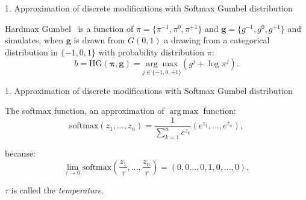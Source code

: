 \documentclass[10pt,aspectratio=169]{beamer}
\renewcommand{\vec}[1]{\mathbf{#1}}
\DeclareMathOperator*{\argmax}{arg\,max}
\begin{document}

\begin{frame}{1. Approximation of discrete modifications with Softmax Gumbel distribution}

    \begin{tcolorbox}[colback=lightgreen,colframe=greentheme,title=\textbf{Definition} (Hardmax Gumbel Function)]
        Hardmax Gumbel~ is a function of  $\pi = \{\pi^{-1},\pi^{0}, \pi^{+1}\}$ and $\vec{g} = \{g^{-1},g^{0}, g^{+1}\}$ and simulates, when $\vec{g}$ is drawn from $G(0,1)$ a drawing from a categorical distribution in $\{-1,0,1\}$ with probability distribution $\pi$:  
        \begin{equation}
            b = \mbox{HG}(\bm{\pi}, \vec{g}) = \underset{{j \in \{-1,0,+1\}}}{\arg \max} (g^j+ \log \pi^j).
        \end{equation}
    \end{tcolorbox}

\end{frame}

\begin{frame}{1. Approximation of discrete modifications with Softmax Gumbel distribution}
    
    The softmax function, an approximation of $\argmax$ function:
    \begin{equation}
        \mbox{softmax}\left(z_1,\ldots,z_n\right) = \frac{1}{\sum_{k=1}^n e^{z_k}}(e^{z_1},\ldots,e^{z_n}),
    \end{equation}

    because: 
    \begin{equation}
        \lim_{\tau \rightarrow 0} \mbox{softmax}\left(\frac{z_1}{\tau},\ldots,\frac{z_n}{\tau}\right) = (0,0\ldots,0,1,0,\dots, 0), 
    \end{equation}

    \pause
    $\tau$ is called the \emph{temperature}.

\end{frame}
\end{document}

